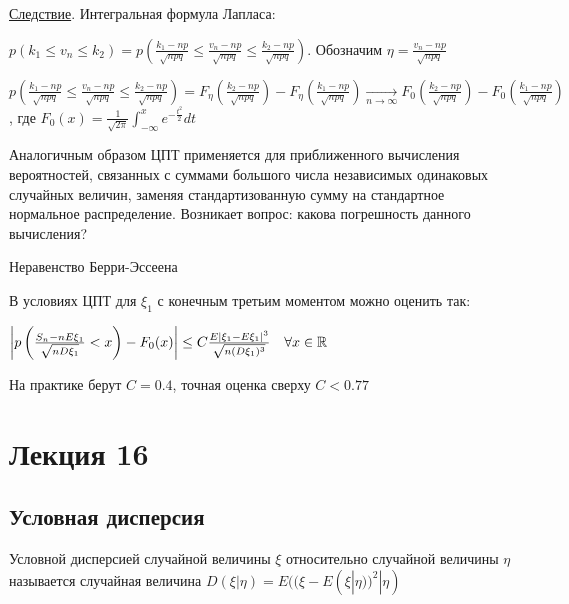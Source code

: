 \documentclass[12pt]{article}
\begin{document}
\underline{Следствие}. Интегральная формула Лапласа:

$p(k_1 \leq v_n \leq k_2) = p\left(\frac{k_1 - np}{\sqrt{npq}} \leq \frac{v_n - np}{\sqrt{npq}} \leq \frac{k_2 - np}{\sqrt{npq}}\right)$. Обозначим $\eta = \frac{v_n - np}{\sqrt{npq}}$

$p\left(\frac{k_1 - np}{\sqrt{npq}} \leq \frac{v_n - np}{\sqrt{npq}} \leq \frac{k_2 - np}{\sqrt{npq}}\right) = F_\eta\left(\frac{k_2 - np}{\sqrt{npq}}\right) - F_\eta\left(\frac{k_1 - np}{\sqrt{npq}}\right) \underset{n \to \infty}{\longrightarrow} F_0\left(\frac{k_2 - np}{\sqrt{npq}}\right) - F_0\left(\frac{k_1 - np}{\sqrt{npq}}\right)$,
где $F_0(x) = \frac{1}{\sqrt{2\pi}} \int_{-\infty}^x e^{-\frac{t^2}{2}} dt$

\Nota Аналогичным образом ЦПТ применяется для приближенного вычисления вероятностей, связанных с суммами большого числа независимых одинаковых случайных величин, заменяя стандартизованную сумму на стандартное нормальное распределение.
Возникает вопрос: какова погрешность данного вычисления?

\hypertarget{berryesseentheorem}{}

\begin{MyTheorem}
    \Ths Неравенство Берри-Эссеена

    В условиях ЦПТ для $\xi_1$ с конечным третьим моментом можно оценить так:

    $\left|p\left(\frac{S_n - nE\xi_1}{\sqrt{nD\xi_1}} < x\right) - F_0(x)\right| \leq C\frac{E|\xi_1 - E\xi_1|^3}{\sqrt{n(D\xi_1)^3}} \quad \forall x \in \mathbb{R}$
\end{MyTheorem}

\Nota На практике берут $C = 0.4$, точная оценка сверху $C < 0.77$






\section{Лекция 16}

\subsection{Условная дисперсия}

\hypertarget{conditionalvariance}{}

\Def Условной дисперсией случайной величины $\xi$ относительно случайной величины $\eta$ называется случайная величина 
$D(\xi | \eta) = E((\xi - E(\xi | \eta))^2 | \eta)$
\end{document}

